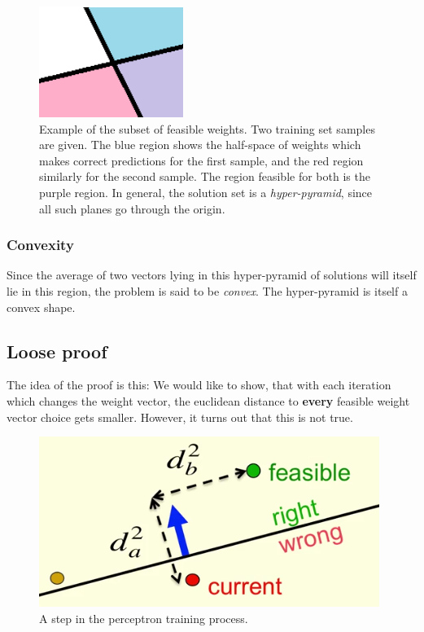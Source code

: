 \documentclass[12pt, a4paper]{article}
\numberwithin{equation}{section}
\begin{document}
\begin{figure}
\centering
\includegraphics{hyper_pyramid}
\caption{Example of the subset of feasible weights. Two training set samples are given. The blue region shows the half-space of weights which makes correct predictions for the first sample, and the red region similarly for the second sample. The region feasible for both is the purple region. In general, the solution set is a \textit{hyper-pyramid}, since all such planes go through the origin.}
\label{fig:hyper_pyramid}
\end{figure}

\subsubsection{Convexity}
Since the average of two vectors lying in this hyper-pyramid of solutions will itself lie in this region, the problem is said to be \textit{convex}. The hyper-pyramid is itself a convex shape.

\subsection{Loose proof}
The idea of the proof is this: We would like to show, that with each iteration which changes the weight vector, the euclidean distance to \textbf{every} feasible weight vector choice gets smaller. However, it turns out that this is not true.

\begin{figure}
\centering
\includegraphics{perceptron_training}
\caption{A step in the perceptron training process.}
\label{fig:perceptron_training}
\end{figure}
\end{document}
